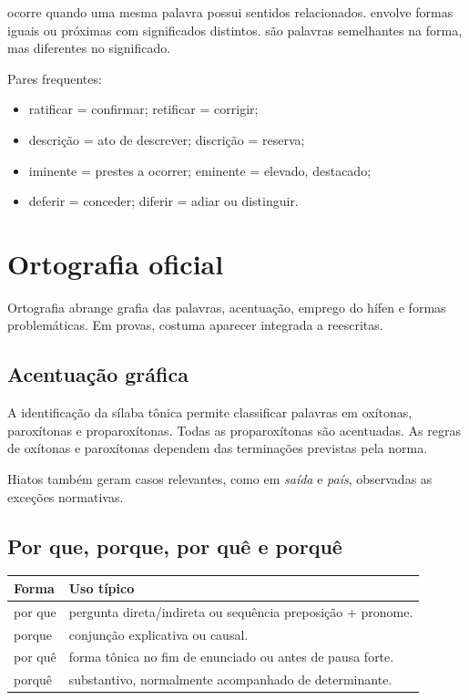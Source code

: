  ocorre quando uma mesma palavra possui sentidos relacionados.  envolve formas iguais ou próximas com significados distintos.  são palavras semelhantes na forma, mas diferentes no significado.

Pares frequentes:
\begin{itemize}
\item ratificar = confirmar; retificar = corrigir;
\item descrição = ato de descrever; discrição = reserva;
\item iminente = prestes a ocorrer; eminente = elevado, destacado;
\item deferir = conceder; diferir = adiar ou distinguir.
\end{itemize}

\section{Ortografia oficial}

Ortografia abrange grafia das palavras, acentuação, emprego do hífen e formas problemáticas. Em provas, costuma aparecer integrada a reescritas.

\subsection{Acentuação gráfica}

A identificação da sílaba tônica permite classificar palavras em oxítonas, paroxítonas e proparoxítonas. Todas as proparoxítonas são acentuadas. As regras de oxítonas e paroxítonas dependem das terminações previstas pela norma.

Hiatos também geram casos relevantes, como em \emph{saída} e \emph{país}, observadas as exceções normativas.

\subsection{Por que, porque, por quê e porquê}

\begin{table}[ht]
\centering
\small
\begin{tabularx}{\textwidth}{l X}
\toprule
Forma & Uso típico \\
\midrule
por que & pergunta direta/indireta ou sequência preposição + pronome. \\
porque & conjunção explicativa ou causal. \\
por quê & forma tônica no fim de enunciado ou antes de pausa forte. \\
porquê & substantivo, normalmente acompanhado de determinante. \\
\bottomrule
\end{tabularx}
\end{table}

